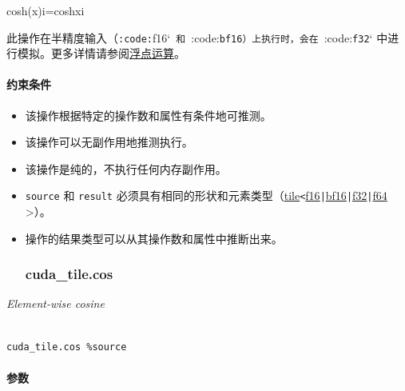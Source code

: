 \documentclass{article}
\begin{document}
cosh(x)i=coshxi


此操作在半精度输入（\texttt{:code:}f16`\texttt{ 和 }:code:\texttt{bf16}\texttt{）上执行时，会在 }:code:\texttt{f32}` 中进行模拟。更多详情请参阅\href{https://docs.nvidia.com/cuda/tile-ir/latest/sections/operations.html#op-group-floating-point}{浮点运算}。





\paragraph{约束条件}


\begin{itemize}
\item 该操作根据特定的操作数和属性有条件地可推测。
\item 该操作可以无副作用地推测执行。
\item 该操作是纯的，不执行任何内存副作用。
\item \texttt{source} 和 \texttt{result} 必须具有相同的形状和元素类型（\href{https://docs.nvidia.com/cuda/tile-ir/latest/sections/types.html#type-tile}{tile}\texttt{<}\href{https://docs.nvidia.com/cuda/tile-ir/latest/sections/types.html#subsection-element-types}{f16}\texttt{|}\href{https://docs.nvidia.com/cuda/tile-ir/latest/sections/types.html#subsection-element-types}{bf16}\texttt{|}\href{https://docs.nvidia.com/cuda/tile-ir/latest/sections/types.html#subsection-element-types}{f32}\texttt{|}\href{https://docs.nvidia.com/cuda/tile-ir/latest/sections/types.html#subsection-element-types}{f64} >）。
\item 操作的结果类型可以从其操作数和属性中推断出来。




\subsubsection{cuda\_tile.cos}


\end{itemize}
\textit{Element-wise cosine}




\begin{lstlisting}

cuda_tile.cos %source

\end{lstlisting}



\paragraph{参数}
\end{document}
